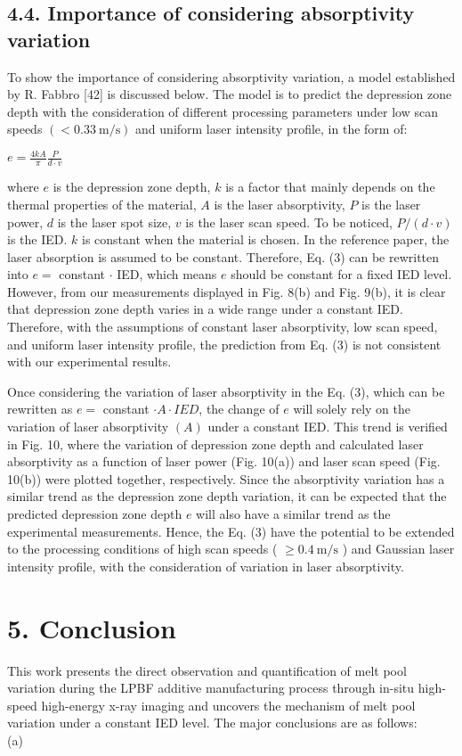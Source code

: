 \documentclass[10pt]{article}
\begin{document}
\subsection*{4.4. Importance of considering absorptivity variation}
To show the importance of considering absorptivity variation, a model established by R. Fabbro [42] is discussed below. The model is to predict the depression zone depth with the consideration of different processing parameters under low scan speeds $(<0.33 \mathrm{~m} / \mathrm{s})$ and uniform laser intensity profile, in the form of:

$e=\frac{4 k A}{\pi} \frac{P}{d \cdot v}$

where $e$ is the depression zone depth, $k$ is a factor that mainly depends on the thermal properties of the material, $A$ is the laser absorptivity, $P$ is the laser power, $d$ is the laser spot size, $v$ is the laser scan speed. To be noticed, $P /(d \cdot v)$ is the IED. $k$ is constant when the material is chosen. In the reference paper, the laser absorption is assumed to be constant. Therefore, Eq. (3) can be rewritten into $e=$ constant $\cdot$ IED, which means $e$ should be constant for a fixed IED level. However, from our measurements displayed in Fig. 8(b) and Fig. 9(b), it is clear that depression zone depth varies in a wide range under a constant IED. Therefore, with the assumptions of constant laser absorptivity, low scan speed, and uniform laser intensity profile, the prediction from Eq. (3) is not consistent with our experimental results.

Once considering the variation of laser absorptivity in the Eq. (3), which can be rewritten as $e=$ constant $\cdot A \cdot I E D$, the change of $e$ will solely rely on the variation of laser absorptivity $(A)$ under a constant IED. This trend is verified in Fig. 10, where the variation of depression zone depth and calculated laser absorptivity as a function of laser power (Fig. 10(a)) and laser scan speed (Fig. 10(b)) were plotted together, respectively. Since the absorptivity variation has a similar trend as the depression zone depth variation, it can be expected that the predicted depression zone depth $e$ will also have a similar trend as the experimental measurements. Hence, the Eq. (3) have the potential to be extended to the processing conditions of high scan speeds ( $\geq 0.4 \mathrm{~m} / \mathrm{s}$ ) and Gaussian laser intensity profile, with the consideration of variation in laser absorptivity.

\section*{5. Conclusion}
This work presents the direct observation and quantification of melt pool variation during the LPBF additive manufacturing process through in-situ high-speed high-energy x-ray imaging and uncovers the mechanism of melt pool variation under a constant IED level. The major conclusions are as follows:\\
(a)
\end{document}
